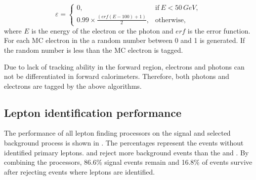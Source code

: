 \begin{equation}
\varepsilon=
\begin{cases}
  0, & \text{if}\ E < 50\,GeV,\\
  0.99 \times \frac{(erf(E - 100) + 1 )}{2}, & \text{otherwise},
\end{cases}
\end{equation}
where $E$ is the energy of the electron or the photon and $erf$ is the error function. For each MC electron in the \LumiCAL a random number between 0 and 1 is generated. If the random number is less than \varepsilon the MC electron is tagged.

Due to lack of tracking ability in the forward region, electrons and photons can not be differentiated in forward calorimeters. Therefore, both photons and electrons are tagged by the above algorithms.








\subsection{Lepton identification performance}

The performance of all lepton finding processors on the signal and selected background process is shown in . The percentages represent the events without identified primary leptons.  \BonoLeptonFinder and \BonoTauFinder reject more background events than the \IsolatedLeptonFinderProcessor and \TauFinderProcessor. By combining the processors, 86.6\% signal events remain and 16.8\% of \HepProcess{\Pep \Pem \to \Pquark\Pquark\Pquark\Pquark\Plepton\Pnu} events survive after rejecting events where leptons are identified.

